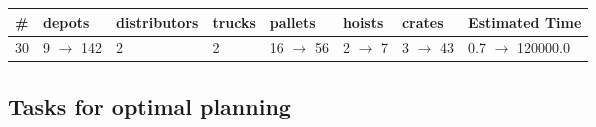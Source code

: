 \documentclass{article}
\begin{document}
                        \begin{center}
                        \begin{tabular}{@{}l|l|l|l|l|l|l|l@{}}
                        \# & depots & distributors & trucks & pallets & hoists & crates & Estimated Time\\\midrule
                        30&9 $\rightarrow$ 142&2&2&16 $\rightarrow$ 56&2 $\rightarrow$ 7&3 $\rightarrow$ 43&0.7 $\rightarrow$ 120000.0
                        \end{tabular}
                        \end{center}
                    
                                \subsection*{Tasks for optimal planning}
                                
\end{document}
